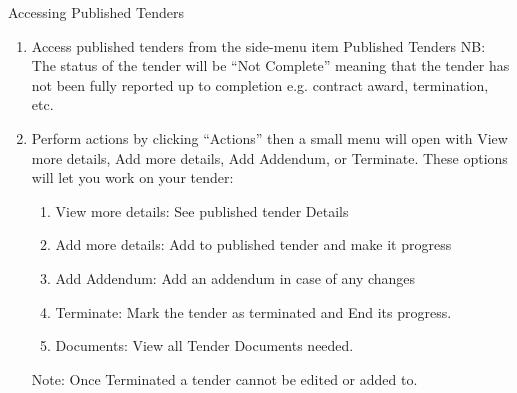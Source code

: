 \documentclass [12pt]{book}
\begin{document}
Accessing Published Tenders
\begin{enumerate}
\item	Access published tenders from the side-menu item Published Tenders
NB: The status of the tender will be “Not Complete” meaning that the tender has not been fully reported up to completion e.g. contract award, termination, etc.

\item	Perform actions by clicking “Actions” then a small menu will open with View more details, Add more details, Add Addendum, or Terminate.
These options will let you work on your tender:
\begin{enumerate}
\item	View more details: See published tender Details 
\item	Add more details: Add to published tender and make it progress
\item	Add Addendum: Add an addendum in case of any changes
\item	Terminate: Mark the tender as terminated and End its progress.
\item	Documents: View all Tender Documents needed.
\end{enumerate}

Note: Once Terminated a tender cannot be edited or added to.
\end{enumerate}
\end{document}
